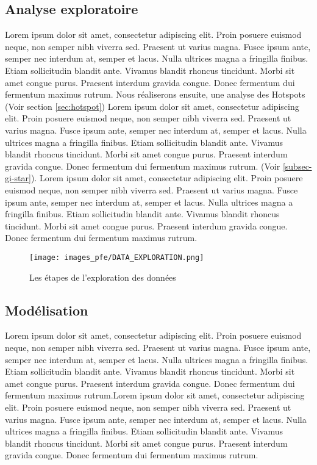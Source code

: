 \subsection{Analyse exploratoire}
Lorem ipsum dolor sit amet, consectetur adipiscing elit. Proin posuere euismod neque, non semper nibh viverra sed. Praesent ut varius magna. Fusce ipsum ante, semper nec interdum at, semper et lacus. Nulla ultrices magna a fringilla finibus. Etiam sollicitudin blandit ante. Vivamus blandit rhoncus tincidunt. Morbi sit amet congue purus. Praesent interdum gravida congue. Donec fermentum dui fermentum maximus rutrum. Nous réaliserons ensuite, une analyse des Hotspots (Voir section \ref{sec:hotspot}) Lorem ipsum dolor sit amet, consectetur adipiscing elit. Proin posuere euismod neque, non semper nibh viverra sed. Praesent ut varius magna. Fusce ipsum ante, semper nec interdum at, semper et lacus. Nulla ultrices magna a fringilla finibus. Etiam sollicitudin blandit ante. Vivamus blandit rhoncus tincidunt. Morbi sit amet congue purus. Praesent interdum gravida congue. Donec fermentum dui fermentum maximus rutrum. (Voir \ref{subsec-gi-star}). Lorem ipsum dolor sit amet, consectetur adipiscing elit. Proin posuere euismod neque, non semper nibh viverra sed. Praesent ut varius magna. Fusce ipsum ante, semper nec interdum at, semper et lacus. Nulla ultrices magna a fringilla finibus. Etiam sollicitudin blandit ante. Vivamus blandit rhoncus tincidunt. Morbi sit amet congue purus. Praesent interdum gravida congue. Donec fermentum dui fermentum maximus rutrum.

\begin{figure}[hbt!]
  \centering
  \texttt{[image: images\_pfe/DATA\_EXPLORATION.png]}
  \caption{Les étapes de l'exploration des données}
  \label{fig:data-exploration}
\end{figure}
\FloatBarrier

\subsection{Modélisation}
Lorem ipsum dolor sit amet, consectetur adipiscing elit. Proin posuere euismod neque, non semper nibh viverra sed. Praesent ut varius magna. Fusce ipsum ante, semper nec interdum at, semper et lacus. Nulla ultrices magna a fringilla finibus. Etiam sollicitudin blandit ante. Vivamus blandit rhoncus tincidunt. Morbi sit amet congue purus. Praesent interdum gravida congue. Donec fermentum dui fermentum maximus rutrum.Lorem ipsum dolor sit amet, consectetur adipiscing elit. Proin posuere euismod neque, non semper nibh viverra sed. Praesent ut varius magna. Fusce ipsum ante, semper nec interdum at, semper et lacus. Nulla ultrices magna a fringilla finibus. Etiam sollicitudin blandit ante. Vivamus blandit rhoncus tincidunt. Morbi sit amet congue purus. Praesent interdum gravida congue. Donec fermentum dui fermentum maximus rutrum.

